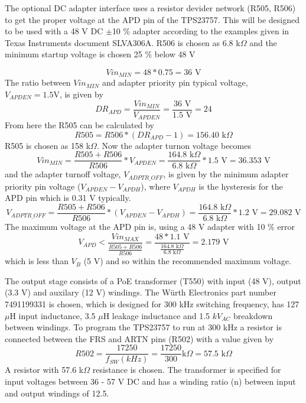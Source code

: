 The optional DC adapter interface uses a resistor devider network
(R505, R506) to get the proper voltage at the APD pin of the
TPS23757. This will be designed to be used with a 48 V DC $\pm$10 \%
adapter according to the examples given in Texas Instruments document
SLVA306A. R506 is chosen as 6.8 k$\Omega$ and the minimum startup
voltage is chosen 25 \% below 48 V

\begin{equation}
Vin_{MIN}=48 * 0.75 = 36 \text{ V}
\end{equation}
The ratio between $Vin_{MIN}$ and adapter priority pin typical voltage,
$V_{APDEN}=1.5\text{V}$, is given by
\begin{equation}
DR_{APD}=\frac{Vin_{MIN}}{V_{APDEN}}=\frac{36 \text{ V}}{1.5 \text{ V}}=24
\end{equation}
From here the R505 can be calculated by
\begin{equation}
R505 = R506 * (DR_{APD} - 1) = 156.40 \text{ k$\Omega$}
\end{equation}
R505 is chosen as 158 k$\Omega$. Now the adapter turnon voltage
becomes
\begin{equation}
Vin_{MIN}=\frac{R505+R506}{R506} * V_{APDEN}
= \frac{164.8 \text{ k$\Omega$}}{6.8 \text{ k$\Omega$}} * 1.5 \text{ V}
= 36.353 \text{ V}
\end{equation}
and the adapter turnoff voltage, $V_{ADPTR\_OFF}$, is given by the
minimum adapter priority pin voltage ($V_{APDEN} - V_{APDH}$), where
$V_{APDH}$ is the hysteresis for the APD pin which is 0.31 V
typically. 
\begin{equation}
V_{ADPTR\_OFF}=\frac{R505+R506}{R506} * (V_{APDEN} - V_{APDH})
= \frac{164.8 \text{ k$\Omega$}}{6.8 \text{ k$\Omega$}} * 1.2 \text{ V} =
29.082 \text{ V}
\end{equation}
The maximum voltage at the APD pin is, using a 48 V adapter with 10 \% error
\begin{equation}
V_{APD} < \frac{Vin_{MAX}}{\frac{R505+R506}{R506}}
= \frac{48*1.1 \text{ V}}{\frac{164.8 \text{ k$\Omega$}}{6.8 \text{ k$\Omega$}}}
= 2.179 \text{ V}
\end{equation}
which is less than $V_B$ (5 V) and so within the recommended maximum
voltage.

The output stage consists of a PoE transformer (T550) with input (48 V),
output (3.3 V) and auxilary (12 V) windings. The Würth Electronics
part number 7491199331 is chosen, which is designed for 300 kHz
switching frequency, has 127 $\mu$H input inductance, 3.5 $\mu$H
leakage inductance and 1.5 $kV_{AC}$ breakdown between windings. To
program the TPS23757 to run at 300 kHz a resistor is connected between
the FRS and ARTN pins (R502) with a value given by
\begin{equation}
R502 = \frac{17250}{f_{SW} (kHz)} = \frac{17250}{300} \text{
k$\Omega$} = 57.5 \text{ k$\Omega$}
\end{equation}
A resistor with 57.6 k$\Omega$ resistance is chosen. The transformer
is specified for input voltages between 36 - 57 V DC and has a winding
ratio (n) between input and output windings of 12.5.

